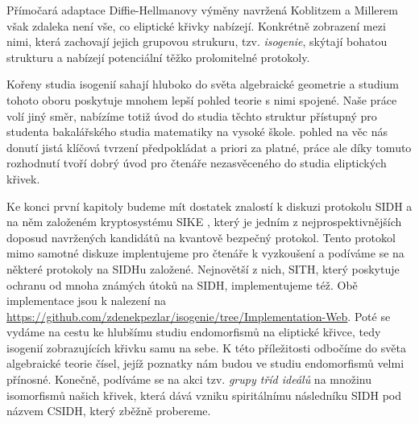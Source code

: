 \documentclass[12pt]{report}
\begin{document}
Přímočará adaptace Diffie-Hellmanovy výměny navržená Koblitzem a Millerem však zdaleka není vše, co eliptické křivky nabízejí. Konkrétně zobrazení mezi nimi, která zachovají jejich grupovou strukuru, tzv. \textit{isogenie}, skýtají bohatou strukturu a nabízejí potenciální těžko prolomitelné protokoly.

Kořeny studia isogenií sahají hluboko do světa algebraické geometrie a studium tohoto oboru poskytuje mnohem lepší pohled  teorie s nimi spojené. Naše práce volí jiný směr, nabízíme totiž úvod do studia těchto struktur přístupný pro studenta bakalářského studia matematiky na vysoké škole.   pohled na věc nás donutí jistá klíčová tvrzení předpokládat a priori za platné, práce ale díky tomuto rozhodnutí tvoří dobrý úvod pro čtenáře nezasvěceného do studia eliptických křivek.

Ke konci první kapitoly budeme mít dostatek znalostí k diskuzi protokolu SIDH a na něm založeném kryptosystému SIKE \cite{DeFeo3}, který je jedním z nejprospektivnějších doposud navržených kandidátů na kvantově bezpečný protokol. Tento protokol mimo samotné diskuze implentujeme pro čtenáře k vyzkoušení a podíváme se na některé protokoly na SIDHu založené. Nejnovětší z nich, SITH, který poskytuje ochranu od mnoha známých útoků na SIDH, implementujeme též. Obě implementace jsou k nalezení na \url{https://github.com/zdenekpezlar/isogenie/tree/Implementation-Web}. Poté se vydáme na cestu ke hlubšímu studiu endomorfismů na eliptické křivce, tedy isogenií zobrazujících křivku samu na sebe. K této příležitosti odbočíme do světa algebraické teorie čísel, jejíž poznatky nám budou ve studiu endomorfismů velmi přínosné. Konečně, podíváme se na akci tzv. \textit{grupy tříd ideálů} na množinu isomorfismů našich křivek, která dává vzniku spiritálnímu následníku SIDH pod názvem CSIDH, který zběžně probereme. 

 
\end{document}
